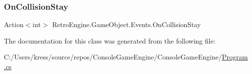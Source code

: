 \subsubsection{\texorpdfstring{OnCollisionStay}{OnCollisionStay}}
{\footnotesize\ttfamily Action$<$int$>$ Retro\+Engine.\+Game\+Object.\+Events.\+On\+Collision\+Stay}



The documentation for this class was generated from the following file\+:\begin{DoxyCompactItemize}
\item 
C\+:/\+Users/kress/source/repos/\+Console\+Game\+Engine/\+Console\+Game\+Engine/\mbox{\hyperlink{_program_8cs}{Program.\+cs}}\end{DoxyCompactItemize}
